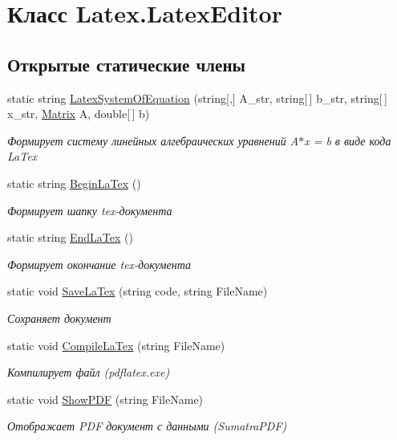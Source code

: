 \hypertarget{class_latex_1_1_latex_editor}{}\section{Класс Latex.\+Latex\+Editor}
\label{class_latex_1_1_latex_editor}
\subsection*{Открытые статические члены}
\begin{DoxyCompactItemize}
\item 
static string \hyperlink{class_latex_1_1_latex_editor_a8c003bd184cc2b8b2632410a7b1d39ed}{Latex\+System\+Of\+Equation} (string\mbox{[},\mbox{]} A\+\_\+str, string\mbox{[}$\,$\mbox{]} b\+\_\+str, string\mbox{[}$\,$\mbox{]} x\+\_\+str, \hyperlink{class_b_l_a_s_1_1_matrix}{Matrix} A, double\mbox{[}$\,$\mbox{]} b)
\begin{DoxyCompactList}\small\item\em Формирует систему линейных алгебраических уравнений A$\ast$x = b в виде кода La\+Tex \end{DoxyCompactList}\item 
static string \hyperlink{class_latex_1_1_latex_editor_a57e3b1474dd286bc0f8bfa0dd718b25a}{Begin\+La\+Tex} ()
\begin{DoxyCompactList}\small\item\em Формирует шапку tex-\/документа \end{DoxyCompactList}\item 
static string \hyperlink{class_latex_1_1_latex_editor_aadd58706a390c458fa7146a3798fe573}{End\+La\+Tex} ()
\begin{DoxyCompactList}\small\item\em Формирует окончание tex-\/документа \end{DoxyCompactList}\item 
static void \hyperlink{class_latex_1_1_latex_editor_a69f48235bc595627993b62d3cfc25201}{Save\+La\+Tex} (string code, string File\+Name)
\begin{DoxyCompactList}\small\item\em Сохраняет документ \end{DoxyCompactList}\item 
static void \hyperlink{class_latex_1_1_latex_editor_ad420e196f1fa78e64ba5bd9e6d823006}{Compile\+La\+Tex} (string File\+Name)
\begin{DoxyCompactList}\small\item\em Компилирует файл (pdflatex.\+exe) \end{DoxyCompactList}\item 
static void \hyperlink{class_latex_1_1_latex_editor_a77a63dbcb2cf87e5eb98707f928e7f6f}{Show\+P\+DF} (string File\+Name)
\begin{DoxyCompactList}\small\item\em Отображает P\+DF документ с данными (Sumatra\+P\+DF) \end{DoxyCompactList}\end{DoxyCompactItemize}
